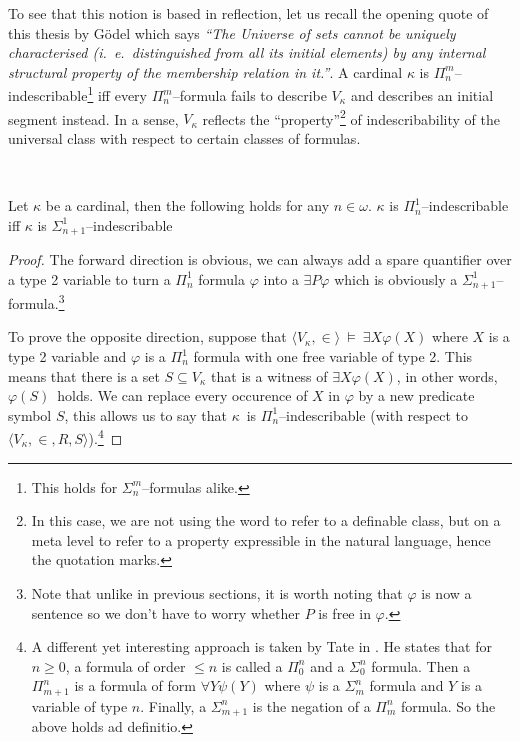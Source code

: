 To see that this notion is based in reflection, let us recall the opening quote of this thesis by Gödel which says \emph{``The Universe of sets cannot be uniquely characterised (i.~e.~distinguished from all its initial elements) by any internal structural property of the membership relation in it.''}. A cardinal $\kappa$ is $\Pi^m_n$–indescribable\footnote{This holds for $\Sigma^m_n$–formulas alike.} iff every $\Pi^m_n$–formula fails to describe $V_\kappa$ and describes an initial segment instead.
In a sense, $V_\kappa$ reflects the ``property''\footnote{In this case, we are not using the word to refer to a definable class, but on a meta level to refer to a property expressible in the natural language, hence the quotation marks.} of indescribability of the universal class with respect to certain classes of formulas.

\


\begin{lemma}
Let $\kappa$ be a cardinal, then the following holds for any $n \in \omega$. $\kappa$ is $\Pi^1_n$–indescribable iff $\kappa$ is $\Sigma^1_{n+1}$–indescribable
\end{lemma}

\begin{proof}
The forward direction is obvious, we can always add a spare quantifier over a type 2 variable to turn a $\Pi^1_n$ formula $\varphi$ into a $\exists P \varphi$ which is obviously a $\Sigma^1_{n+1}$–formula.\footnote{Note that unlike in previous sections, it is worth noting that $\varphi$ is now a sentence so we don't have to worry whether $P$ is free in $\varphi$.}

To prove the opposite direction, suppose that $\langle V_\kappa, \in \rangle~\models~\exists X \varphi(X)$ where $X$ is a type 2 variable and $\varphi$ is a $\Pi^1_n$ formula with one free variable of type 2. 
This means that there is a set $S \subseteq V_\kappa$ that is a witness of $\exists X \varphi(X)$, in other words, $\varphi(S)$ holds. 
We can replace every occurence of $X$ in $\varphi$ by a new predicate symbol $S$, this allows us to say that $\kappa$ is $\Pi^1_n$–indescribable (with respect to $\langle V_\kappa, \in, R, S \rangle$).\footnote{A different yet interesting approach is taken by Tate in \cite{Tait_constructingcardinals}. He states that for $n\geq 0$, a formula of order $\leq n$ is called a $\Pi^n_0$ and a $\Sigma^n_0$ formula. Then a $\Pi^n_{m+1}$ is a formula of form $\forall Y \psi(Y)$ where $\psi$ is a $\Sigma^n_m$ formula and $Y$ is a variable of type $n$. Finally, a $\Sigma^n_{m+1}$ is the negation of a $\Pi^n_m$ formula. So the above holds ad definitio.}
\end{proof}

